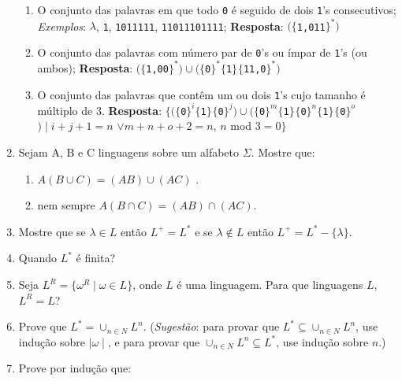 \documentclass[a4paper,12pt]{article}
\newcommand{\alfabeto}[3][\ast]{$\{$#2#3$\}^{#1}$}
\begin{document}
\begin{enumerate}
\begin{enumerate}
		\item O conjunto das palavras em que todo \texttt{0} é seguido de dois \texttt{1}'s consecutivos;
		\newline \textit{Exemplos}: $\lambda$, \texttt{1}, \texttt{1011111}, \texttt{11011101111};
		\newline \textbf{Resposta}: \texttt{$($\alfabeto{1,}{011}$)$}
		\item O conjunto das palavras com número par de \texttt{0}'s ou ímpar de \texttt{1}'s (ou ambos);
		\newline \textbf{Resposta}: $ ($\texttt{\alfabeto{1,}{00}$) \cup ($\alfabeto{}{0}\alfabeto[]{1}{}\alfabeto{11,}{0}}$) $
		\item O conjunto das palavras que contêm um ou dois \texttt{1}'s cujo tamanho é múltiplo de 3. 
		\newline \textbf{Resposta}: $\{ ($\texttt{\alfabeto[i]{}{0}\alfabeto[]{}{1}\alfabeto[j]{0}{}$) \cup ($\alfabeto[m]{}{0}\alfabeto[]{}{1}\alfabeto[n]{0}{}\alfabeto[]{}{1}\alfabeto[o]{0}{}}$) \mid i+j+1 = n $ $\vee m+n+o+2 = n$, $n$ mod $3 = 0 \}$
	\end{enumerate}
	\item Sejam A, B e C linguagens sobre um alfabeto $\Sigma$. Mostre que:
		\begin{enumerate}
		\item $ A ( B \cup C ) = (AB) \cup (AC) $ . 
		\item  nem sempre $ A (B \cap C) = (AB) \cap (AC) $.
		\end{enumerate}
	\item Mostre que se $\lambda \in L$ então $L^{+} = L^{\ast}$ e se $ \lambda \notin L$ então $ L^{+} = L^{\ast} - \{ \lambda \} $.
	\item Quando $L^{\ast}$ é finita?
	\item Seja $ L^{R} = \{ \omega^{R} \mid \omega \in L\}$, onde $L$ é uma linguagem. Para que linguagens $L$, $L^{R} = L$?    
	\item Prove que $L^{\ast}  = \cup_{n \in N} L^{n}$. (\textit{Sugestão}: para provar que $L^{\ast} \subseteq \cup_{n \in N} L^{n}$, use indução sobre $\mid \omega \mid$, e para provar que $\cup_{n \in N} L^{n} \subseteq L^{\ast}$, use indução sobre $n$.) 
	\item Prove por indução que:
		\begin{enumerate}

\end{enumerate}
\end{enumerate}
\end{document}
